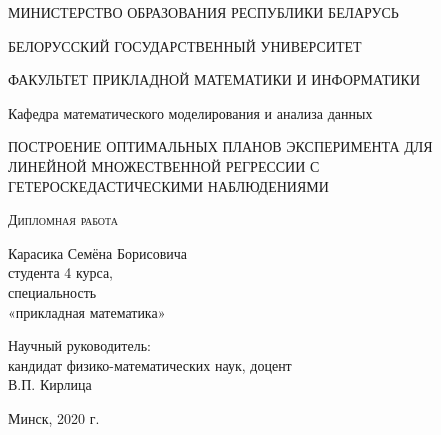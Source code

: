 \begin{titlepage}
	\begin{center}
		\large
		МИНИСТЕРСТВО ОБРАЗОВАНИЯ РЕСПУБЛИКИ БЕЛАРУСЬ
		
		\vspace{0.5cm}
		
		БЕЛОРУССКИЙ ГОСУДАРСТВЕННЫЙ УНИВЕРСИТЕТ
		\vspace{0.5cm}
		
		ФАКУЛЬТЕТ ПРИКЛАДНОЙ МАТЕМАТИКИ И ИНФОРМАТИКИ
		
		\vspace{0.25cm}
		
		Кафедра математического моделирования и анализа данных
		\vfill
		
		{\LARGE ПОСТРОЕНИЕ ОПТИМАЛЬНЫХ ПЛАНОВ ЭКСПЕРИМЕНТА ДЛЯ ЛИНЕЙНОЙ МНОЖЕСТВЕННОЙ РЕГРЕССИИ С ГЕТЕРОСКЕДАСТИЧЕСКИМИ  НАБЛЮДЕНИЯМИ}
		\bigskip
		
		\textsc{Дипломная работа}\\
	\end{center}
	\vfill
	
	\newlength{\ML}
	\hfill\begin{minipage}{0.5\textwidth}
		Карасика Семёна Борисовича\\
		студента 4 курса,\\
		специальность\\
		«прикладная математика»\\
	\end{minipage}%
	\bigskip
	
	\hfill\begin{minipage}{0.5\textwidth}
		Научный руководитель:\\
		кандидат физико-математических наук, доцент\\В.П. Кирлица
	\end{minipage}%
	\vfill
	
	\begin{center}
		Минск, 2020 г.
	\end{center}
\end{titlepage}
